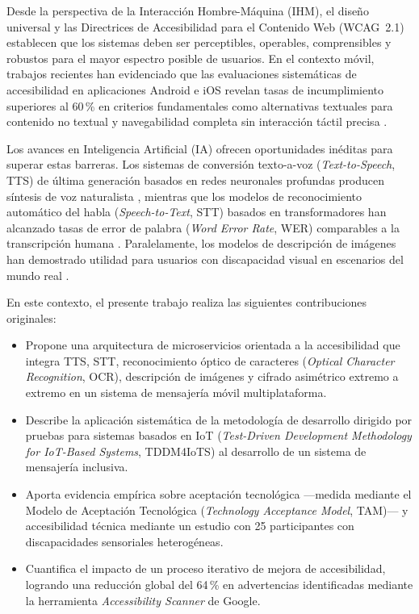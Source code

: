 \documentclass[journal]{IEEEtran}
\begin{document}
	Desde la perspectiva de la Interacci\'on Hombre-M\'aquina (IHM), el dise\~no universal \cite{story1998} y las Directrices de Accesibilidad para el Contenido Web (WCAG~2.1) \cite{w3c2018} establecen que los sistemas deben ser perceptibles, operables, comprensibles y robustos para el mayor espectro posible de usuarios. En el contexto m\'ovil, trabajos recientes han evidenciado que las evaluaciones sistem\'aticas de accesibilidad en aplicaciones Android e iOS revelan tasas de incumplimiento superiores al 60\,\% en criterios fundamentales como alternativas textuales para contenido no textual y navegabilidad completa sin interacci\'on t\'actil precisa \cite{chen2022, acosta2021}.
	
	Los avances en Inteligencia Artificial (IA) ofrecen oportunidades in\'editas para superar estas barreras. Los sistemas de conversi\'on texto-a-voz (\textit{Text-to-Speech}, TTS) de \'ultima generaci\'on basados en redes neuronales profundas producen s\'intesis de voz naturalista \cite{tan2021}, mientras que los modelos de reconocimiento autom\'atico del habla (\textit{Speech-to-Text}, STT) basados en transformadores han alcanzado tasas de error de palabra (\textit{Word Error Rate}, WER) comparables a la transcripci\'on humana \cite{baevski2020}. Paralelamente, los modelos de descripci\'on de im\'agenes han demostrado utilidad para usuarios con discapacidad visual en escenarios del mundo real \cite{dognin2021}.
	
	En este contexto, el presente trabajo realiza las siguientes contribuciones originales:
	\begin{itemize}
		\item Propone una arquitectura de microservicios orientada a la accesibilidad que integra TTS, STT, reconocimiento \'optico de caracteres (\textit{Optical Character Recognition}, OCR), descripci\'on de im\'agenes y cifrado asim\'etrico extremo a extremo en un sistema de mensajer\'ia m\'ovil multiplataforma.
		\item Describe la aplicaci\'on sistem\'atica de la metodolog\'ia de desarrollo dirigido por pruebas para sistemas basados en IoT (\textit{Test-Driven Development Methodology for IoT-Based Systems}, TDDM4IoTS) \cite{guerrero2020} al desarrollo de un sistema de mensajer\'ia inclusiva.
		\item Aporta evidencia emp\'irica sobre aceptaci\'on tecnol\'ogica ---medida mediante el Modelo de Aceptaci\'on Tecnol\'ogica (\textit{Technology Acceptance Model}, TAM)--- y accesibilidad t\'ecnica mediante un estudio con 25 participantes con discapacidades sensoriales heterog\'eneas.
		\item Cuantifica el impacto de un proceso iterativo de mejora de accesibilidad, logrando una reducci\'on global del 64\,\% en advertencias identificadas mediante la herramienta \textit{Accessibility Scanner} de Google.
	\end{itemize}
	
\end{document}
